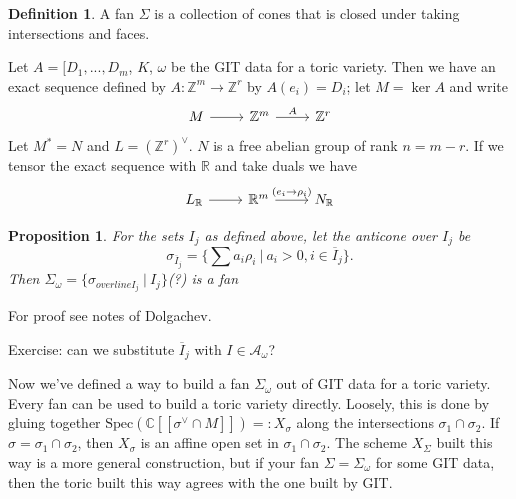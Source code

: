 \documentclass{article}
\newtheorem{prop}[theorem]{Proposition}
\theoremstyle{definition}
\newtheorem{definition}[theorem]{Definition}
\theoremstyle{remark}
\numberwithin{theorem}{section}
\newcommand{\C}{\mathbb{C}}
\newcommand{\Z}{\mathbb{Z}}
\newcommand{\Spec}{\text{Spec}}
\newenvironment{defn}{
	\begin{mdframed}
		\vspace{-0.5em}
		\begin{definition}
		}{
		\end{definition}
	\end{mdframed}
}
\begin{document}
	\begin{defn}
		A fan $\Sigma$ is a collection of cones that is closed under taking intersections and faces.
	\end{defn}
	Let $A=[D_1,...,D_m$, $K$, $\omega$ be the GIT data for a toric variety. Then we have an exact sequence defined by $A:\Z^m \to \Z^r$ by $A(e_i) = D_i$; let $M=\ker A$ and write
	\[\begin{tikzcd}
		M & {\Z^m} & {\Z^r}
		\arrow[from=1-1, to=1-2]
		\arrow["A", from=1-2, to=1-3]
	\end{tikzcd}\]
	Let $M^\ast = N$ and $L=(\Z^r)^\vee$. $N$ is a free abelian group of rank $n=m-r$. If we tensor the exact sequence with $\mathbb{R}$ and take duals we have
	\[\begin{tikzcd}
		{L_\mathbb{R}} & {\mathbb{R}^m} & {N_\mathbb{R}}
		\arrow[from=1-1, to=1-2]
		\arrow["{(e_i\to\rho_i)}", from=1-2, to=1-3]
	\end{tikzcd}\]
	\begin{prop}
		For the sets $I_j$ as defined above, let the anticone over $I_j$ be
		$$\sigma_{\overline{I}_j} = \{\sum a_i \rho_i ~|~ a_i >0, i\in \overline{I}_j\}.$$
		Then $\Sigma_\omega = \{\sigma_{overline{I_j}} ~|~ I_j \}$(?) is a fan
		\label{p:fan-of-git}
	\end{prop}
	For proof see notes of Dolgachev. \vspace{1em}

	Exercise: can we substitute $\overline{I}_j$ with $I\in\mathcal{A}_\omega$? \vspace*{1em}

	Now we've defined a way to build a fan $\Sigma_\omega$ out of GIT data for a toric variety. Every fan can be used to build a toric variety directly. Loosely, this is done by gluing together $\Spec(\C[[\sigma^\vee\cap M]]) =: X_\sigma$ along the intersections $\sigma_1\cap \sigma_2$. If $\sigma=\sigma_1\cap\sigma_2$, then $X_\sigma$ is an affine open set in $\sigma_1\cap \sigma_2$. The scheme $X_\Sigma$ built this way is a more general construction, but if your fan $\Sigma=\Sigma_\omega$ for some GIT data, then the toric built this way agrees with the one built by GIT. 
\end{document}
